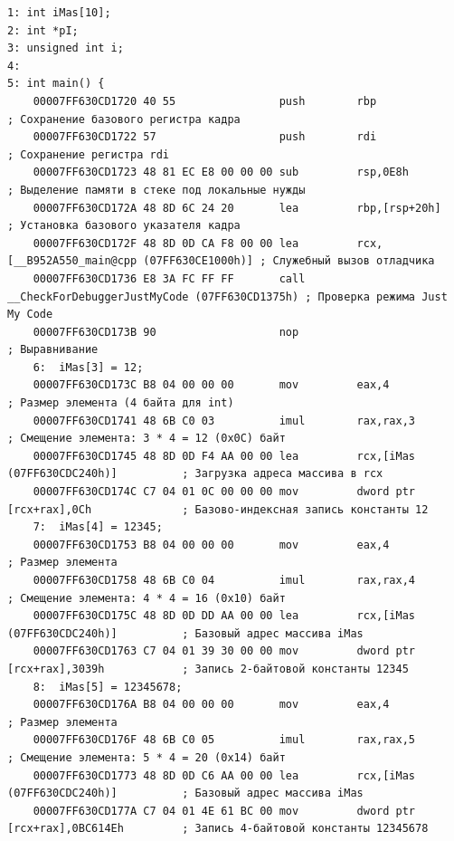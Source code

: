 \documentclass[14pt, a4paper]{extarticle}
\begin{document}
	\begin{lstlisting}[language={[x86masm]Assembler}, caption={Дизассемблированный код с сопоставлением инструкциям Си}]
     1: int iMas[10];
2: int *pI;
3: unsigned int i;
4: 
5: int main() {
	00007FF630CD1720 40 55                push        rbp                                  ; Сохранение базового регистра кадра
	00007FF630CD1722 57                   push        rdi                                  ; Сохранение регистра rdi
	00007FF630CD1723 48 81 EC E8 00 00 00 sub         rsp,0E8h                             ; Выделение памяти в стеке под локальные нужды
	00007FF630CD172A 48 8D 6C 24 20       lea         rbp,[rsp+20h]                        ; Установка базового указателя кадра
	00007FF630CD172F 48 8D 0D CA F8 00 00 lea         rcx,[__B952A550_main@cpp (07FF630CE1000h)] ; Служебный вызов отладчика
	00007FF630CD1736 E8 3A FC FF FF       call        __CheckForDebuggerJustMyCode (07FF630CD1375h) ; Проверка режима Just My Code
	00007FF630CD173B 90                   nop                                              ; Выравнивание
	6: 	iMas[3] = 12;
	00007FF630CD173C B8 04 00 00 00       mov         eax,4                                ; Размер элемента (4 байта для int)
	00007FF630CD1741 48 6B C0 03          imul        rax,rax,3                            ; Смещение элемента: 3 * 4 = 12 (0x0C) байт
	00007FF630CD1745 48 8D 0D F4 AA 00 00 lea         rcx,[iMas (07FF630CDC240h)]          ; Загрузка адреса массива в rcx
	00007FF630CD174C C7 04 01 0C 00 00 00 mov         dword ptr [rcx+rax],0Ch              ; Базово-индексная запись константы 12
	7: 	iMas[4] = 12345;
	00007FF630CD1753 B8 04 00 00 00       mov         eax,4                                ; Размер элемента
	00007FF630CD1758 48 6B C0 04          imul        rax,rax,4                            ; Смещение элемента: 4 * 4 = 16 (0x10) байт
	00007FF630CD175C 48 8D 0D DD AA 00 00 lea         rcx,[iMas (07FF630CDC240h)]          ; Базовый адрес массива iMas
	00007FF630CD1763 C7 04 01 39 30 00 00 mov         dword ptr [rcx+rax],3039h            ; Запись 2-байтовой константы 12345
	8: 	iMas[5] = 12345678;
	00007FF630CD176A B8 04 00 00 00       mov         eax,4                                ; Размер элемента
	00007FF630CD176F 48 6B C0 05          imul        rax,rax,5                            ; Смещение элемента: 5 * 4 = 20 (0x14) байт
	00007FF630CD1773 48 8D 0D C6 AA 00 00 lea         rcx,[iMas (07FF630CDC240h)]          ; Базовый адрес массива iMas
	00007FF630CD177A C7 04 01 4E 61 BC 00 mov         dword ptr [rcx+rax],0BC614Eh         ; Запись 4-байтовой константы 12345678

\end{lstlisting}
\end{document}
